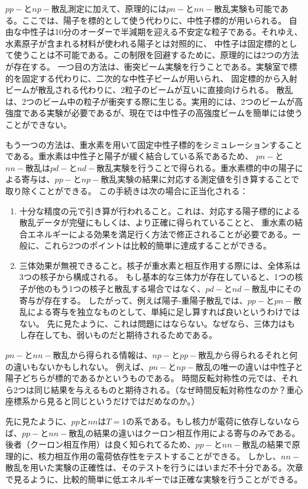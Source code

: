 \documentclass[a4paper,11pt,uplatex]{jsarticle}
\begin{document}
$pp-$と$np-$散乱測定に加えて、原理的には$pn-$と$nn-$散乱実験も可能である。ここでは、陽子を標的として使う代わりに、中性子標的が用いられる。
自由な中性子は10分のオーダーで半減期を迎える不安定な粒子である。それゆえ、水素原子が含まれる材料が使われる陽子とは対照的に、
中性子は固定標的として使うことは不可能である。この制限を回避するために、原理的には2つの方法が存在する。
一つ目の方法は、衝突ビーム実験を行うことである。実験室で標的を固定する代わりに、二次的な中性子ビームが用いられ、
固定標的から入射ビームが散乱される代わりに、2粒子のビームが互いに直接向けられる。
散乱は、2つのビーム中の粒子が衝突する際に生じる。実用的には、2つのビームが高強度である実験が必要であるが、現在では中性子の高強度ビームを簡単には使うことができない。

もう一つの方法は、重水素を用いて固定中性子標的をシミュレーションすることである。重水素は中性子と陽子が緩く結合している系であるため、
$pn-$と$nn-$散乱は$pd-$と$nd-$散乱実験を行うことで得られる。重水素標的中の陽子による寄与は、$pp-$と$np-$散乱実験の結果に対応する測定値を引き算することで取り除くことができる。
この手続きは次の場合に正当化される：
\begin{enumerate}
  \item 十分な精度の元で引き算が行われること。これは、対応する陽子標的による散乱データが完璧にもしくは、より正確に得られていることと、
        重水素の結合エネルギーによる効果を満足行く方法で修正されることが必要である。一般に、これら2つのポイントは比較的簡単に達成することができる。

  \item 三体効果が無視できること。核子が重水素と相互作用する際には、全体系は3つの核子から構成される。
        もし基本的な三体力が存在していると、1つの核子が他のもう1つの核子と散乱する場合ではなく、$pd-$と$nd-$散乱中にその寄与が存在する。
        したがって、例えば陽子-重陽子散乱では、$pp-$と$pn-$散乱による寄与を独立なものとして、単純に足し算すれば良いというわけではない。
        先に見たように、これは問題にはならない。なぜなら、三体力はもし存在しても、弱いものだと期待されるためである。
\end{enumerate}

$pn-$と$nn-$散乱から得られる情報は、$np-$と$pp-$散乱から得られるそれと何の違いもないかもしれない。
例えば、$pn-$と$np-$散乱の唯一の違いは中性子と陽子どちらが標的であるかというものである。
時間反転対称性の元では、それら2つは同じ結果を与えるものと期待される。（なぜ時間反転対称性なのか？重心座標系から見ると同じというだけではだめなのか。）

先に見たように、$pp$と$nn$は$T=1$の系である。もし核力が電荷に依存しないならば、$pp-$と$nn-$散乱の結果の違いはクーロン相互作用による寄与のみである。
後者（クーロン相互作用）は良く知られてるため、$pp-$と$nn-$散乱の結果で原理的に、核力相互作用の電荷依存性をテストすることができる。
しかし、$nn-$散乱を用いた実験の正確性は、そのテストを行うにはいまだ不十分である。次章で見るように、比較的簡単に低エネルギーでは正確な実験を行うことができる。
\end{document}
